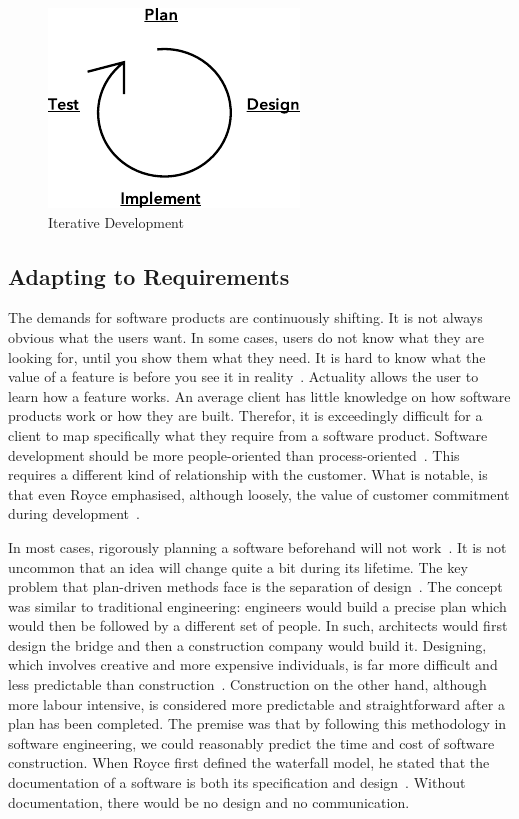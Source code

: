 \documentclass[english]{tktltiki2}
\begin{document}
\begin{figure}[h!]

    \vspace{1cm}
    \centering

    \includegraphics{figures/iterative-development}

    \caption{Iterative Development}
    \label{figure:iterative-development}

\end{figure}

\subsection{Adapting to Requirements}

The demands for software products are continuously shifting. It is not always obvious what the users want. In some cases, users do not know what they are looking for, until you show them what they need. It is hard to know what the value of a feature is before you see it in reality~\cite{Fow05}. Actuality allows the user to learn how a feature works. An average client has little knowledge on how software products work or how they are built. Therefor, it is exceedingly difficult for a client to map specifically what they require from a software product. Software development should be more people-oriented than process-oriented~\cite{Fow05}. This requires a different kind of relationship with the customer. What is notable, is that even Royce emphasised, although loosely, the value of customer commitment during development~\cite{Roy70}.

In most cases, rigorously planning a software beforehand will not work~\cite{LB03}. It is not uncommon that an idea will change quite a bit during its lifetime. The key problem that plan-driven  methods face is the separation of design~\cite{LB03, Fow05}. The concept was similar to traditional engineering: engineers would build a precise plan which would then be followed by a different set of people. In such, architects would first design the bridge and then a construction company would build it. Designing, which involves creative and more expensive individuals, is far more difficult and less predictable than construction~\cite{Fow05}. Construction on the other hand, although more labour intensive, is considered more predictable and straightforward after a plan has been completed. The premise was that by following this methodology in software engineering, we could reasonably predict the time and cost of software construction. When Royce first defined the waterfall model, he stated that the documentation of a software is both its specification and design~\cite{Roy70}. Without documentation, there would be no design and no communication.
\end{document}
